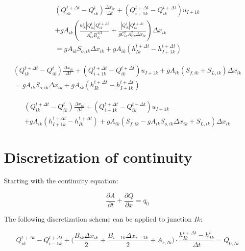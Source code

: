 \documentclass[11pt]{article}
\begin{document}
\begin{equation}
  \begin{split}
    (Q_{ik}^{t + \Delta t} - Q_{ik}^t) \frac{\Delta x_{ik}}{\Delta t} + (Q_{i+1k}^{t + \Delta t} - Q_{ik}^{t + \Delta t}) u_{I+1k} \\ + g A_{ik} (\frac{n_{ik}^2 |Q_{ik}^t| Q_{ik}^{t + \Delta t}}{A_{ik}^2 R_{ik}^{4/3}} + \frac{|Q_{ik}^t| Q_{ik}^{t + \Delta t}}{g C_{ik}^2 A_{cik}^2 \Delta x_{ik}}) \Delta x_{ik} \\ =
    g A_{ik} S_{o,ik} \Delta x_{ik} + g A_{ik} (h_{Ik}^{t + \Delta t} - h_{I+1k}^{t + \Delta t})
  \end{split}
\end{equation}


\begin{equation}
  \begin{split}
    (Q_{ik}^{t + \Delta t} - Q_{ik}^t) \frac{\Delta x_{ik}}{\Delta t} + (Q_{i+1k}^{t + \Delta t} - Q_{ik}^{t + \Delta t}) u_{I+1k} + g A_{ik} (S_{f,ik} + S_{L,ik}) \Delta x_{ik} \\ =
    g A_{ik} S_{o,ik} \Delta x_{ik} + g A_{ik} (h_{Ik}^{t + \Delta t} - h_{I+1k}^{t + \Delta t})
  \end{split}
\end{equation}

\begin{equation}
  \begin{split}
    (Q_{ik}^{t + \Delta t} - Q_{ik}^t) \frac{\Delta x_{ik}}{\Delta t} + (Q_{i+1k}^{t + \Delta t} - Q_{ik}^{t + \Delta t}) u_{I+1k} \\ + g A_{ik} (h_{I+1k}^{t + \Delta t} - h_{Ik}^{t + \Delta t}) + g A_{ik} (S_{f,ik} -
    g A_{ik} S_{o,ik} \Delta x_{ik} + S_{L,ik}) \Delta x_{ik}
  \end{split}
\end{equation}

\section{Discretization of continuity}

Starting with the continuity equation:

\begin{equation}
  \frac{\partial A}{\partial t} + \frac{\partial Q}{\partial x} = q_0
\end{equation}

The following discretization scheme can be applied to junction $Ik$:

\begin{equation}
 Q_{ik}^{t + \Delta t} - Q_{i - 1k}^{t + \Delta t} + \biggl( \frac{B_{ik} \Delta x_{ik}}{2} + \frac{B_{i - 1k} \Delta x_{i - 1k}}{2} + A_{s,Ik} \biggr) \cdot \frac{h_{Ik}^{t + \Delta t} - h_{Ik}^t}{\Delta t} = Q_{0,Ik}
\end{equation}
\end{document}
